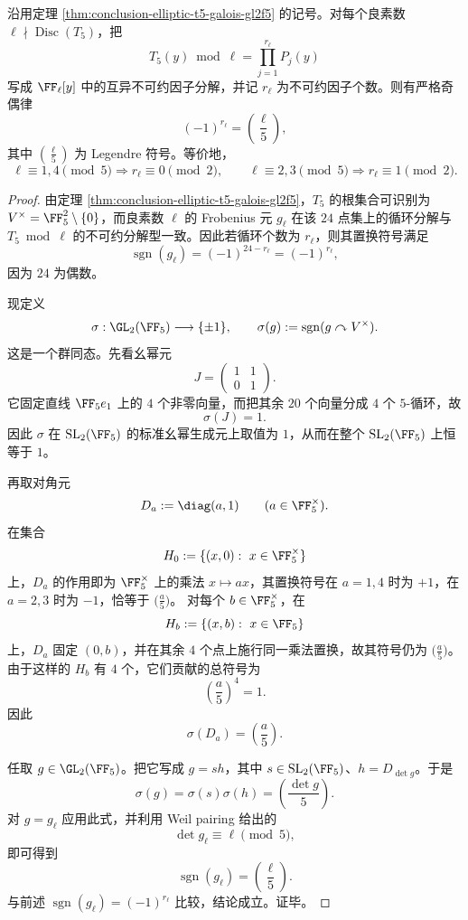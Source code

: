 \begin{theorem}\label{thm:conclusion-elliptic-t5-irreducible-factor-parity-legendre}
沿用定理 \ref{thm:conclusion-elliptic-t5-galois-gl2f5} 的记号。对每个良素数 \(\ell\nmid \operatorname{Disc}(T_5)\)，把
\[
T_5(y)\bmod \ell=\prod_{j=1}^{r_\ell}P_j(y)
\]
写成 \(\FF_\ell[y]\) 中的互异不可约因子分解，并记 \(r_\ell\) 为不可约因子个数。则有严格奇偶律
\[
(-1)^{r_\ell}=\left(\frac{\ell}{5}\right),
\]
其中 \(\left(\frac{\ell}{5}\right)\) 为 Legendre 符号。等价地，
\[
\ell\equiv 1,4\!\!\!\!\pmod 5 \Longrightarrow r_\ell\equiv 0\!\!\!\!\pmod 2,
\qquad
\ell\equiv 2,3\!\!\!\!\pmod 5 \Longrightarrow r_\ell\equiv 1\!\!\!\!\pmod 2.
\]
\end{theorem}
\begin{proof}
由定理 \ref{thm:conclusion-elliptic-t5-galois-gl2f5}，\(T_5\) 的根集合可识别为 \(V^\times=\FF_5^2\setminus\{0\}\)，而良素数 \(\ell\) 的 Frobenius 元 \(g_\ell\) 在该 \(24\) 点集上的循环分解与 \(T_5\bmod \ell\) 的不可约分解型一致。因此若循环个数为 \(r_\ell\)，则其置换符号满足
\[
\operatorname{sgn}(g_\ell)=(-1)^{24-r_\ell}=(-1)^{r_\ell},
\]
因为 \(24\) 为偶数。

现定义
\[
\sigma:\GL_2(\FF_5)\longrightarrow \{\pm 1\},
\qquad
\sigma(g):=\operatorname{sgn}(g\curvearrowright V^\times).
\]
这是一个群同态。先看幺幂元
\[
J=\begin{pmatrix}1&1\\0&1\end{pmatrix}.
\]
它固定直线 \(\FF_5 e_1\) 上的 \(4\) 个非零向量，而把其余 \(20\) 个向量分成 \(4\) 个 \(5\)-循环，故
\[
\sigma(J)=1.
\]
因此 \(\sigma\) 在 \(\mathrm{SL}_2(\FF_5)\) 的标准幺幂生成元上取值为 \(1\)，从而在整个 \(\mathrm{SL}_2(\FF_5)\) 上恒等于 \(1\)。

再取对角元
\[
D_a:=\diag(a,1)\qquad (a\in \FF_5^\times).
\]
在集合
\[
H_0:=\{(x,0):\ x\in \FF_5^\times\}
\]
上，\(D_a\) 的作用即为 \(\FF_5^\times\) 上的乘法 \(x\mapsto ax\)，其置换符号在 \(a=1,4\) 时为 \(+1\)，在 \(a=2,3\) 时为 \(-1\)，恰等于 \(\bigl(\frac{a}{5}\bigr)\)。
对每个 \(b\in \FF_5^\times\)，在
\[
H_b:=\{(x,b):\ x\in \FF_5\}
\]
上，\(D_a\) 固定 \((0,b)\)，并在其余 \(4\) 个点上施行同一乘法置换，故其符号仍为 \(\bigl(\frac{a}{5}\bigr)\)。由于这样的 \(H_b\) 有 \(4\) 个，它们贡献的总符号为
\[
\left(\frac{a}{5}\right)^4=1.
\]
因此
\[
\sigma(D_a)=\left(\frac{a}{5}\right).
\]

任取 \(g\in \GL_2(\FF_5)\)。把它写成 \(g=sh\)，其中 \(s\in \mathrm{SL}_2(\FF_5)\)、\(h=D_{\det g}\)。于是
\[
\sigma(g)=\sigma(s)\sigma(h)=\left(\frac{\det g}{5}\right).
\]
对 \(g=g_\ell\) 应用此式，并利用 Weil pairing 给出的
\[
\det g_\ell\equiv \ell \pmod 5,
\]
即可得到
\[
\operatorname{sgn}(g_\ell)=\left(\frac{\ell}{5}\right).
\]
与前述 \(\operatorname{sgn}(g_\ell)=(-1)^{r_\ell}\) 比较，结论成立。证毕。
\end{proof}

